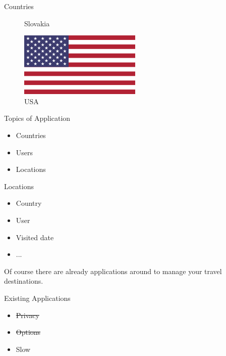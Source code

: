 \begin{frame}{Countries}
\begin{figure}[!ht]
\begin{minipage}{.24\textwidth}
\caption{Slovakia}
\end{minipage}
\begin{minipage}{.24\textwidth}
\centering
\includegraphics[width=0.8\linewidth]{img/countries/usa.png}
\caption{USA}
\end{minipage}

\end{figure}

\end{frame}

\begin{frame}{Topics of Application}
\begin{itemize}
\item Countries
\item Users
\item Locations
\end{itemize}
\end{frame}

\begin{frame}{Locations}
\begin{itemize}
\item Country
\item User
\item Visited date
\item ...
\end{itemize}
\end{frame}

Of course there are already applications around to manage
your travel destinations.


\begin{frame}{Existing Applications}
\begin{itemize}
\item \sout{Privacy}
\item \sout{Options}
\item Slow
\end{itemize}
\end{frame}


